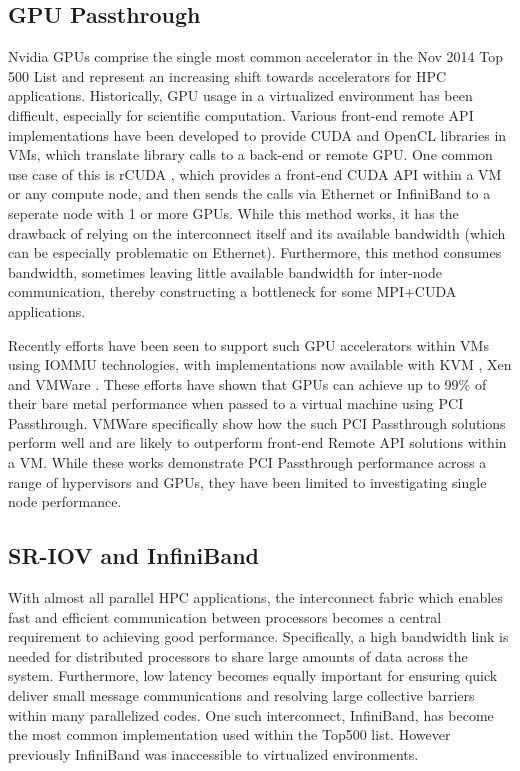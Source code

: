 \documentclass{sigplanconf}
\begin{document}
\subsection{GPU Passthrough}

Nvidia GPUs comprise the single most common accelerator in the Nov 2014 Top 500 List \cite{www-top500} and represent an increasing shift towards accelerators for HPC applications. Historically, GPU usage in a virtualized environment has been difficult, especially for scientific computation. Various front-end remote API implementations have been developed to provide CUDA and OpenCL libraries in VMs, which translate library calls to a back-end or remote GPU. One common use case of this is rCUDA \cite{duato2011enabling}, which provides a front-end CUDA API within a VM or any compute node, and then sends the calls via Ethernet or InfiniBand to a seperate node with 1 or more GPUs. While this method works, it has the drawback of relying on the interconnect itself and its available bandwidth (which can be especially problematic on Ethernet). Furthermore, this method consumes bandwidth, sometimes leaving little available bandwidth for inter-node communication, thereby constructing a bottleneck for some MPI+CUDA applications.

Recently efforts have been seen to support such GPU accelerators within VMs using IOMMU technologies, with implementations now available with KVM \cite{Walters2014cloud}, Xen \cite{Younge2014hpgc} and VMWare \cite{Vu2014}.  These efforts have shown that GPUs can achieve up to 99\% of their bare metal performance when passed to a virtual machine using PCI Passthrough.  VMWare specifically show how the such PCI Passthrough solutions perform well and are likely to outperform front-end Remote API solutions within a VM\cite{Walters2014cloud}.  While these works demonstrate PCI Passthrough performance across a range of hypervisors and GPUs, they have been limited to investigating single node performance. 

\subsection{SR-IOV and InfiniBand}

With almost all parallel HPC applications, the interconnect fabric which enables fast and efficient communication between processors becomes a central requirement to achieving good performance. Specifically, a high bandwidth link is needed for distributed processors to share large amounts of data across the system. Furthermore, low latency becomes equally important for ensuring quick deliver small message communications and resolving large collective barriers within many parallelized codes. One such interconnect, InfiniBand, has become the most common implementation used within the Top500 list. However previously InfiniBand was inaccessible to virtualized environments.  
\end{document}
